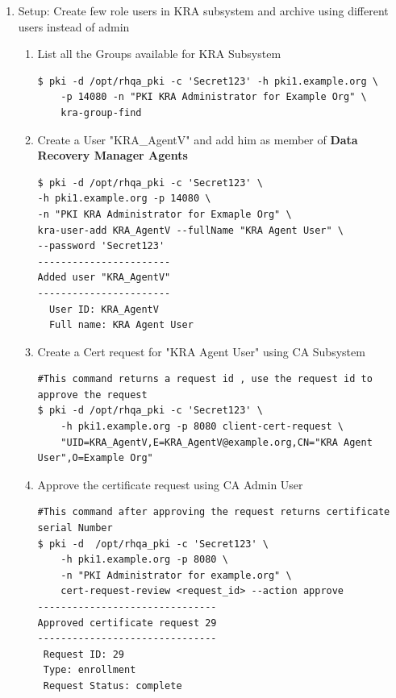 \documentclass[a4paper]{article}
\begin{document}
\begin{enumerate}[label*=\arabic*.]
\begin{enumerate}[label*=\arabic*.]
                \item Setup: Create few role users in KRA subsystem and archive using different users instead of admin
                    \begin{enumerate}[label*=\arabic*.]
                        \item List all the Groups available for KRA Subsystem
                            \begin{lstlisting}[style=bashInputStyle]
$ pki -d /opt/rhqa_pki -c 'Secret123' -h pki1.example.org \
    -p 14080 -n "PKI KRA Administrator for Example Org" \
    kra-group-find                                
                            \end{lstlisting}
                        \item Create a User "KRA\_AgentV" and add him as member of \textbf{Data Recovery Manager Agents} 
                            \begin{lstlisting}[style=bashInputStyle]
$ pki -d /opt/rhqa_pki -c 'Secret123' \
-h pki1.example.org -p 14080 \
-n "PKI KRA Administrator for Exmaple Org" \
kra-user-add KRA_AgentV --fullName "KRA Agent User" \
--password 'Secret123'
-----------------------
Added user "KRA_AgentV"
-----------------------
  User ID: KRA_AgentV
  Full name: KRA Agent User
                            \end{lstlisting}
                        \item Create a Cert request for "KRA Agent User" using CA Subsystem 
                            \begin{lstlisting}[style=bashInputStyle]
#This command returns a request id , use the request id to approve the request
$ pki -d /opt/rhqa_pki -c 'Secret123' \
    -h pki1.example.org -p 8080 client-cert-request \
    "UID=KRA_AgentV,E=KRA_AgentV@example.org,CN="KRA Agent User",O=Example Org" 
                            \end{lstlisting}
                        \item Approve the certificate request using CA Admin User
                            \begin{lstlisting}[style=bashInputStyle]
#This command after approving the request returns certificate serial Number
$ pki -d  /opt/rhqa_pki -c 'Secret123' \
    -h pki1.example.org -p 8080 \
    -n "PKI Administrator for example.org" \
    cert-request-review <request_id> --action approve
-------------------------------
Approved certificate request 29
-------------------------------
 Request ID: 29
 Type: enrollment
 Request Status: complete

\end{lstlisting}
\end{enumerate}
\end{enumerate}
\end{enumerate}
\end{document}
